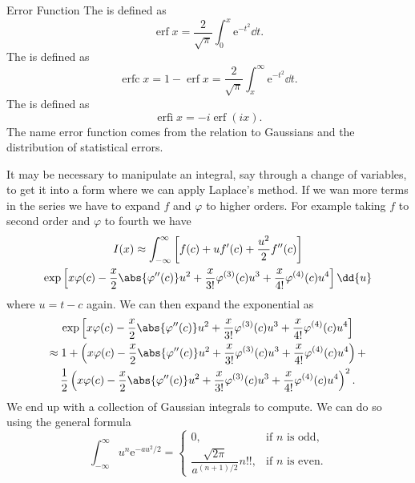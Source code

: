 \documentclass[fleqn]{NotesClass}
\newcommand*{\e}{\mathrm{e}}
\DeclareMathOperator{\erf}{erf}
\DeclareMathOperator{\erfc}{erfc}
\DeclareMathOperator{\erfi}{erfi}
\begin{document}
    \begin{dfn}{Error Function}{}
        The  is defined as
        \begin{equation}
            \erf x = \frac{2}{\sqrt{\pi}} \int_0^x \e^{-t^2} \dd{t}.
        \end{equation}
        The  is defined as
        \begin{equation}
            \erfc x = 1 - \erf x = \frac{2}{\sqrt{\pi}} \int_x^{\infty} \e^{-t^2}\dd{t}.
        \end{equation}
        The  is defined as
        \begin{equation}
            \erfi x = -i\erf(ix).
        \end{equation}
        The name error function comes from the relation to Gaussians and the distribution of statistical errors.
    \end{dfn}
    
    It may be necessary to manipulate an integral, say through a change of variables, to get it into a form where we can apply Laplace's method.
    If we wan more terms in the series we have to expand \(f\) and \(\varphi\) to higher orders.
    For example taking \(f\) to second order and \(\varphi\) to fourth we have
    \begin{multline}
        I(x) \approx \int_{-\infty}^{\infty} \left[ f(c) + uf'(c) + \frac{u^2}{2}f''(c)\right] \\
        \exp\left[ x\varphi(c) - \frac{x}{2}\abs{\varphi''(c)}u^2 + \frac{x}{3!}\varphi^{(3)}(c)u^3 + \frac{x}{4!}\varphi^{(4)}(c)u^{4} \right] \dd{u}
    \end{multline}
    where \(u = t - c\) again.
    We can then expand the exponential as
    \begin{multline}
        \exp\left[ x\varphi(c) - \frac{x}{2}\abs{\varphi''(c)}u^2 + \frac{x}{3!}\varphi^{(3)}(c)u^3 + \frac{x}{4!}\varphi^{(4)}(c)u^{4} \right] \\
        \approx 1 + \left( x\varphi(c) - \frac{x}{2}\abs{\varphi''(c)}u^2 + \frac{x}{3!}\varphi^{(3)}(c)u^3 + \frac{x}{4!}\varphi^{(4)}(c)u^{4} \right) +\\
        \frac{1}{2}\left( x\varphi(c) - \frac{x}{2}\abs{\varphi''(c)}u^2 + \frac{x}{3!}\varphi^{(3)}(c)u^3 + \frac{x}{4!}\varphi^{(4)}(c)u^{4} \right)^2.
    \end{multline}
    We end up with a collection of Gaussian integrals to compute.
    We can do so using the general formula
    \begin{equation}
        \int_{-\infty}^{\infty} u^n\e^{-au^2/2} = 
        \begin{cases}
            0, & \text{if \(n\) is odd},\\
            \dfrac{\sqrt{2\pi}}{a^{(n+1)/2}} n!!, &\text{if \(n\) is even}.
        \end{cases}
    \end{equation}
    
\end{document}
